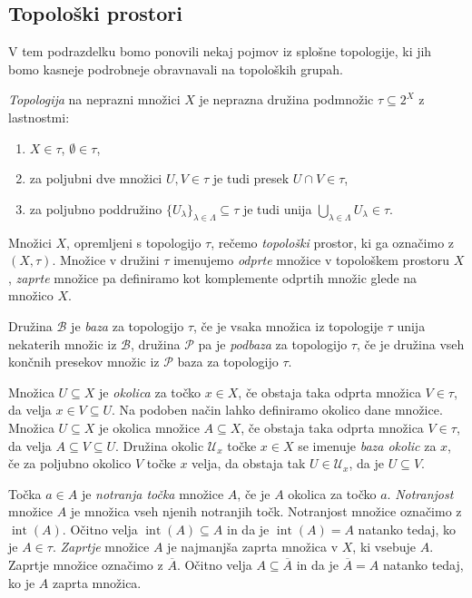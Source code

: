 \documentclass[mat1]{fmfdelo}
\newcommand{\Ucurl}{\mathcal{U}}
\newcommand{\closure}[1]{\overline{#1}}
\DeclareMathOperator{\interior}{int}
\begin{document}
\subsection{Topološki prostori}
V tem podrazdelku bomo ponovili nekaj pojmov iz splo\-šne topologije, ki jih bomo kasneje podrobneje obravnavali na topoloških grupah.

\emph{Topologija} na neprazni množici $X$ je neprazna družina podmnožic $\tau \subseteq 2^X$ z lastnostmi:
\begin{enumerate}
\item $X \in \tau$, $\emptyset \in \tau$,
\item za poljubni dve množici $U,V \in \tau$ je tudi presek $U \cap V \in \tau$,
\item za poljubno poddružino $\lbrace U_{\lambda} \rbrace_{\lambda \in \Lambda} \subseteq \tau$ je tudi unija $\bigcup\limits_{\lambda \in \Lambda}^{} U_{\lambda} \in \tau$.
\end{enumerate}
Množici $X$, opremljeni s topologijo $\tau$, rečemo \emph{topološki} prostor, ki ga označimo z $(X, \tau)$. Množice v družini $\tau$ imenujemo \emph{odprte} množice v topološkem prostoru $X$, \emph{zaprte} množice pa definiramo kot komplemente odprtih množic glede na množico $X$.

Družina $\mathcal{B}$ je \emph{baza} za topologijo $\tau$, če je vsaka množica iz topologije $\tau$ unija nekaterih množic iz $\mathcal{B}$, družina $\mathcal{P}$ pa je \emph{podbaza} za topologijo $\tau$, če je družina vseh končnih presekov množic iz $\mathcal{P}$ baza za topologijo $\tau$.

Množica $U \subseteq X$ je \emph{okolica} za točko $x \in X$, če obstaja taka odprta množica $V \in \tau$, da velja $x \in V \subseteq U$. Na podoben način lahko definiramo okolico dane množice.
Množica $U \subseteq X$ je okolica množice $A \subseteq X$, če obstaja taka odprta množica $V \in \tau$, da velja $A \subseteq V \subseteq U$.
Družina okolic $\Ucurl_x$ točke $x \in X$ se imenuje \emph{baza okolic} za $x$, če za poljubno okolico $V$ točke $x$ velja, da obstaja tak $U \in \Ucurl_x$, da je $U \subseteq V$.

Točka $a \in A$ je \emph{notranja točka} množice $A$, če je $A$ okolica za točko $a$.
\emph{Notranjost} množice $A$ je množica vseh njenih notranjih točk. Notranjost množice označimo z $\interior(A)$. Očitno velja $\interior(A) \subseteq A$ in da je $\interior(A) = A$ natanko tedaj, ko je $A \in \tau$.
\emph{Zaprtje} množice $A$ je najmanjša zaprta množica v $X$, ki vsebuje $A$. Zaprtje množice označimo z $\closure{A}$. Očitno velja $A \subseteq \closure{A}$ in da je $\closure{A} = A$ natanko tedaj, ko je $A$ zaprta množica.
\end{document}
